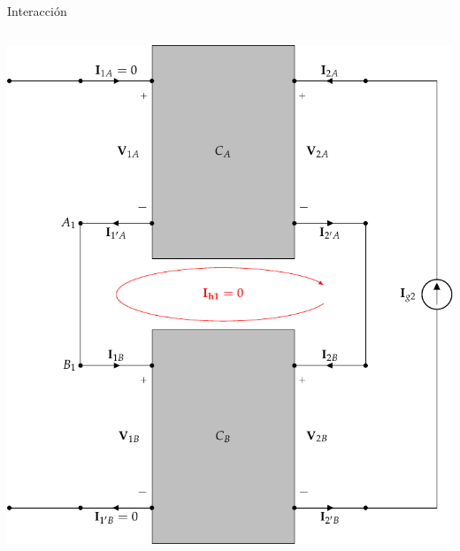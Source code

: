\documentclass[aspectratio=169, usenames,svgnames,dvipsnames]{beamer}
\begin{document}
\begin{frame}[label={sec:orgd8d0f07},plain]{Interacción}
\begin{columns}
\begin{column}{0.5\columnwidth}
\begin{center}
\includegraphics[height=0.8\textheight]{../figs/serie-serie-superposicion-salida.pdf}
\end{center}
\end{column}
\end{columns}
\end{frame}
\end{document}
